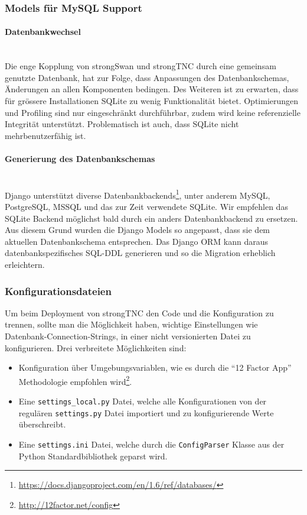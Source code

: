 \subsubsection{Models für MySQL Support}
\paragraph{Datenbankwechsel} \hspace{0pt} \\
Die enge Kopplung von strongSwan und strongTNC durch eine gemeinsam genutzte
Datenbank, hat zur Folge, dass Anpassungen des Datenbankschemas, Änderungen an
allen Komponenten bedingen. Des Weiteren ist zu erwarten, dass für grössere
Installationen SQLite zu wenig Funktionalität bietet. Optimierungen und Profiling sind nur eingeschränkt durchführbar, zudem wird keine referenzielle Integrität
unterstützt. Problematisch ist auch, dass SQLite nicht mehrbenutzerfähig ist.

\paragraph{Generierung des Datenbankschemas} \hspace{0pt} \\
Django unterstützt diverse Datenbankbackends\footnote{\url{https://docs.djangoproject.com/en/1.6/ref/databases/}}, unter
anderem MySQL, PostgreSQL, MSSQL und das zur Zeit verwendete SQLite. Wir
empfehlen das SQLite Backend möglichst bald durch ein anders Datenbankbackend zu
ersetzen. Aus diesem Grund wurden die Django Models so angepasst, dass sie dem
aktuellen Datenbankschema entsprechen. Das Django ORM kann daraus
datenbankspezifisches SQL-DDL generieren und so die Migration erheblich
erleichtern.

\subsubsection{Konfigurationsdateien}

Um beim Deployment von strongTNC den Code und die Konfiguration zu trennen,
sollte man die Möglichkeit haben, wichtige Einstellungen wie
Datenbank-Connection-Strings, in einer nicht versionierten Datei zu
konfigurieren. Drei verbreitete Möglichkeiten sind:

\begin{itemize}
	\item Konfiguration über Umgebungsvariablen, wie es durch die \enquote{12
		Factor App} Methodologie empfohlen
		wird\footnote{\url{http://12factor.net/config}}.
	\item Eine \texttt{settings\_local.py} Datei, welche alle Konfigurationen von
		der regulären \texttt{settings.py} Datei importiert und zu konfigurierende
		Werte überschreibt.
	\item Eine \texttt{settings.ini} Datei, welche durch die \texttt{ConfigParser}
		Klasse aus der Python Standardbibliothek geparst wird.
\end{itemize}


